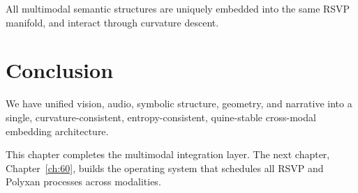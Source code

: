 \begin{corollary}
All multimodal semantic structures are uniquely embedded into the same 
RSVP manifold, and interact through curvature descent.

\end{corollary}

\section{Conclusion}
\label{sec:59:conclusion}

We have unified vision, audio, symbolic structure, geometry, and narrative into
a single, curvature-consistent, entropy-consistent, quine-stable cross-modal
embedding architecture.

This chapter completes the multimodal integration layer.  
The next chapter, Chapter~\ref{ch:60}, builds the operating system that schedules
all RSVP and Polyxan processes across modalities.

